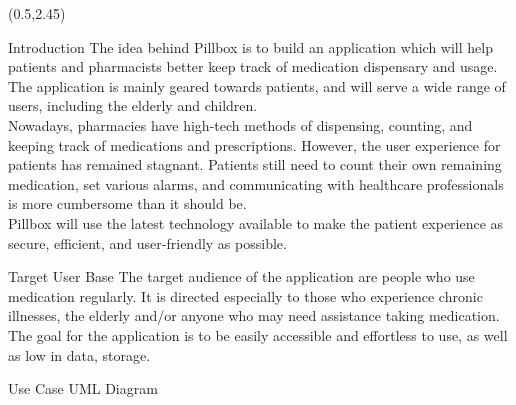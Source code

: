 \documentclass[22pt]{beamer}
\begin{document}
\begin{frame}[fragile]
\begin{textblock}{7.25}(0.5,2.45)
\vspace{2.5cm}
\begin{block}{Introduction}
The idea behind Pillbox is to build an application which will help patients and pharmacists better keep track of medication dispensary and usage. The application is mainly geared towards patients, and will serve a wide range of users, including the elderly and children. \\
Nowadays, pharmacies have high-tech methods of dispensing, counting, and keeping track of medications and prescriptions. However, the user experience for patients has remained stagnant. Patients still need to count their own remaining medication, set various alarms, and communicating with healthcare professionals is more cumbersome than it should be.\\
Pillbox will use the latest technology available to make the patient experience as secure, efficient, and user-friendly as possible.
\end{block}



\begin{block}{Target User Base}
The target audience of the application are people who use medication regularly. It is directed especially to those who experience chronic illnesses, the elderly and/or anyone who may need assistance taking medication. The goal for the application is to be easily accessible and effortless to use, as well as low in data, storage. 
\end{block}





\begin{block}{Use Case UML Diagram}


\end{block}
\end{textblock}
\end{frame}
\end{document}
